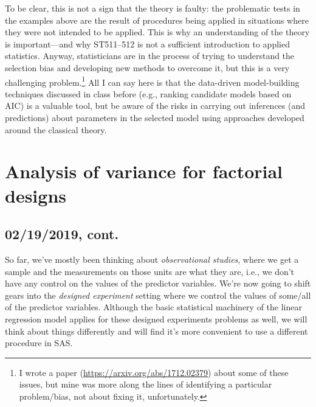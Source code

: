 \documentclass[a4paper, 12pt]{article}
\theoremstyle{plain}
\theoremstyle{definition}
\theoremstyle{remark}
\begin{document}
To be clear, this is not a sign that the theory is faulty: the problematic tests in the examples above are the result of procedures being applied in situations where they were not intended to be applied.  This is why an understanding of the theory is important---and why ST511--512 is not a sufficient introduction to applied statistics.  Anyway, statisticians are in the process of trying to understand the selection bias and developing new methods to overcome it, but this is a very challenging problem.\footnote{I wrote a paper (\url{https://arxiv.org/abs/1712.02379}) about some of these issues, but mine was more along the lines of identifying a particular problem/bias, not about fixing it, unfortunately.}  All I can say here is that the data-driven model-building techniques discussed in class before (e.g., ranking candidate models based on AIC) is a valuable tool, but be aware of the risks in carrying out inferences (and predictions) about parameters in the selected model using approaches developed around the classical theory.  




\section{Analysis of variance for factorial designs}

\subsection*{02/19/2019, cont.}

So far, we've mostly been thinking about {\em observational studies}, where we get a sample and the measurements on those units are what they are, i.e., we don't have any control on the values of the predictor variables.  We're now going to shift gears into the {\em designed experiment} setting where we control the values of some/all of the predictor variables.  Although the basic statistical machinery of the linear regression model applies for these designed experiments problems as well, we will think about things differently and will find it's more convenient to use a different procedure in SAS.  
\end{document}
